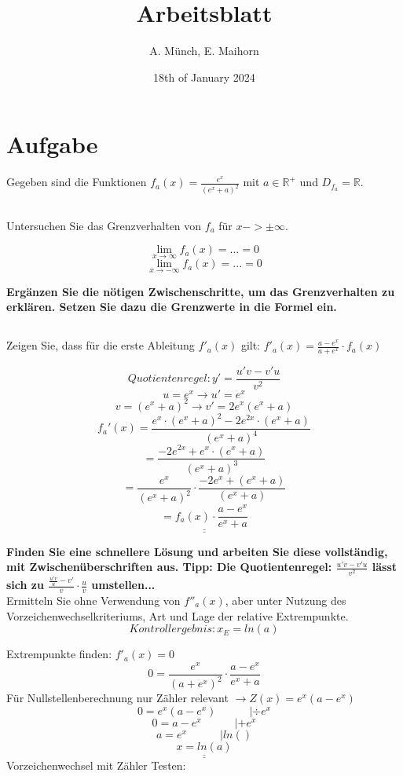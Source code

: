 \documentclass{article}
\title{Arbeitsblatt}
\author{A. Münch, E. Maihorn}
\date{18th of January 2024}
\def\doubleunderline#1{\underline{\underline{#1}}}
\begin{document}
\maketitle

\section{Aufgabe}

Gegeben sind die Funktionen $ {f_a(x)} = \frac{e^x}{(e^x+a)^2}$ mit $ a \in \mathbb{R^+}$ und $ D_{f_a} = \mathbb{R}$.

\subsection{}
Untersuchen Sie das Grenzverhalten von $ f_a $ für $x->\pm \infty$.

\[ \lim_{x\to\infty} f_a(x) = ... = 0\]
\[ \lim_{x\to -\infty} f_a(x) = ... = 0\]

\textbf{Ergänzen Sie die nötigen Zwischenschritte, um das Grenzverhalten zu erklären. Setzen Sie dazu die   Grenzwerte in die Formel ein.}

\subsection{}
Zeigen Sie, dass für die erste Ableitung $f'_a(x)$ gilt: $f'_a(x) = \frac{a-e^x}{a+e^x} \cdot f_a(x)$

\[ Quotientenregel: y' = \frac{u'v-v'u}{v^2}\]
\[ u=e^x \xrightarrow{} u' = e^x\]
\[ v=(e^x+a)^2 \xrightarrow{} v'=2e^x(e^x+a)\]
\[ f_a'(x) = \frac{e^x \cdot (e^x+a)^2-2e^{2x} \cdot (e^x+a)}{(e^x+a)^4}\]
\[ = \frac{-2e^{2x}+e^x \cdot (e^x+a)}{(e^x+a)^3}\]
\[ = \frac{e^x}{(e^x+a)^2} \cdot \frac{-2e^x+(e^x+a)}{(e^x+a)}\]
\[ \doubleunderline {= f_a(x) \cdot \frac{a-e^x}{e^x+a}}\]

\textbf{Finden Sie eine schnellere Lösung und arbeiten Sie diese vollständig, mit Zwischenüberschriften aus. Tipp: Die Quotientenregel: $\frac{u'v-v'u}{v^2} $ lässt sich zu $ \frac{\frac{u'v}{u}-v'}{v} \cdot \frac{u}{v}$ umstellen...} \\

Ermitteln Sie ohne Verwendung von $f''_a(x)$, aber unter Nutzung des Vorzeichenwechselkriteriums, Art und Lage der relative Extrempunkte.
\[Kontrollergebnis: x_E=ln(a)\]

Extrempunkte finden: $f'_a(x)=0 $
\[0=\frac{e^x}{(a+e^x)^2} \cdot \frac{a-e^x}{e^x+a}\]
Für Nullstellenberechnung nur Zähler relevant $ \xrightarrow{} Z(x)=e^x(a-e^x) $
\[ 0=e^x(a-e^x) \quad \quad \quad | \div e^x\]
\[0 = a-e^x \quad \quad \quad | +e^x\]
\[a=e^x \quad \quad \quad | ln()\] 
\[ \doubleunderline{x=ln(a)}\]
Vorzeichenwechsel mit Zähler Testen:
\end{document}
